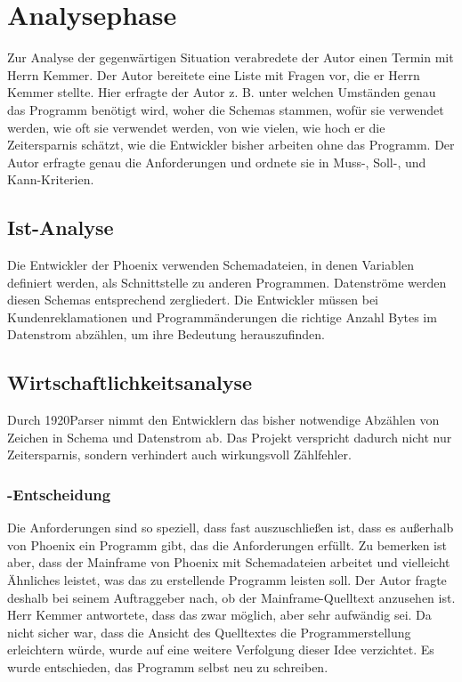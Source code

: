 \section{Analysephase} 
\label{sec:Analysephase}
Zur Analyse der gegenwärtigen Situation verabredete der Autor einen Termin mit Herrn Kemmer. Der Autor bereitete eine Liste mit Fragen vor, die er Herrn Kemmer stellte. Hier erfragte der Autor z. B. unter welchen Umständen genau das Programm benötigt wird, woher die Schemas stammen, wofür sie verwendet werden, wie oft sie verwendet werden, von wie vielen, wie hoch er die Zeitersparnis schätzt, wie die Entwickler bisher arbeiten ohne das Programm. Der Autor erfragte genau die Anforderungen und ordnete sie in Muss-, Soll-, und Kann-Kriterien.

\subsection{Ist-Analyse} 
\label{sec:IstAnalyse}
Die Entwickler der Phoenix verwenden Schemadateien, in denen Variablen definiert werden, als Schnittstelle zu anderen Programmen. Datenströme werden diesen Schemas entsprechend zergliedert. Die Entwickler müssen bei Kundenreklamationen und Programmänderungen die richtige Anzahl Bytes im Datenstrom abzählen, um ihre Bedeutung herauszufinden.

\subsection{Wirtschaftlichkeitsanalyse}
\label{sec:Wirtschaftlichkeitsanalyse}
Durch 1920Parser nimmt den Entwicklern das bisher notwendige Abzählen von Zeichen in Schema und Datenstrom ab. Das Projekt verspricht dadurch nicht nur Zeitersparnis, sondern verhindert auch wirkungsvoll Zählfehler.

\subsubsection{-Entscheidung}
\label{sec:MakeOrBuyEntscheidung}
Die Anforderungen sind so speziell, dass fast auszuschließen ist, dass es außerhalb von Phoenix ein Programm gibt, das die Anforderungen erfüllt. Zu bemerken ist aber, dass der Mainframe von Phoenix mit Schemadateien arbeitet und vielleicht Ähnliches leistet, was das zu erstellende Programm leisten soll. Der Autor fragte deshalb bei seinem Auftraggeber nach, ob der Mainframe-Quelltext anzusehen ist. Herr Kemmer antwortete, dass das zwar möglich, aber sehr aufwändig sei. Da nicht sicher war, dass die Ansicht des Quelltextes die Programmerstellung erleichtern würde, wurde auf eine weitere Verfolgung dieser Idee verzichtet. Es wurde entschieden, das Programm selbst neu zu schreiben.

